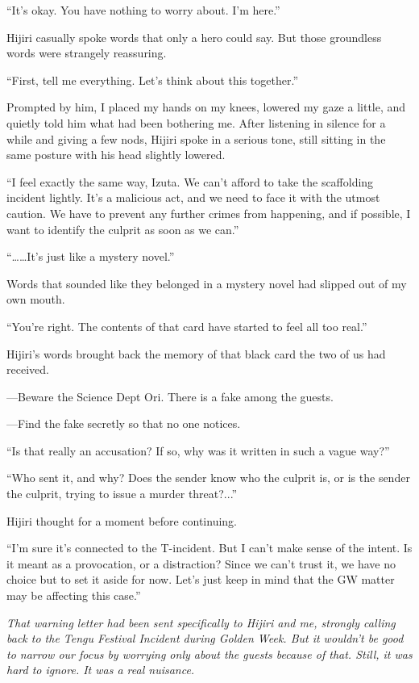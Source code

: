 \documentclass[
    a4paper,
    12pt,
    twoside,
    openany,
    UTF8,
    fontset=windows
]{ctexbook}
\begin{document}
``It's okay. You have nothing to worry about. I'm here.''

Hijiri casually spoke words that only a hero could say. But those groundless words were strangely reassuring.

``First, tell me everything. Let's think about this together.''

Prompted by him, I placed my hands on my knees, lowered my gaze a little, and quietly told him what had been bothering me. After listening in silence for a while and giving a few nods, Hijiri spoke in a serious tone, still sitting in the same posture with his head slightly lowered.

``I feel exactly the same way, Izuta. We can't afford to take the scaffolding incident lightly. It's a malicious act, and we need to face it with the utmost caution. We have to prevent any further crimes from happening, and if possible, I want to identify the culprit as soon as we can.''

``\dots\dots It's just like a mystery novel.''

Words that sounded like they belonged in a mystery novel had slipped out of my own mouth.

``You're right. The contents of that card have started to feel all too real.''

Hijiri's words brought back the memory of that black card the two of us had received.

---Beware the Science Dept Ori. There is a fake among the guests.

---Find the fake secretly so that no one notices.

``Is that really an accusation? If so, why was it written in such a vague way?''

``Who sent it, and why? Does the sender know who the culprit is, or is the sender the culprit, trying to issue a murder threat?...''

Hijiri thought for a moment before continuing.

``I'm sure it's connected to the T-incident. But I can't make sense of the intent. Is it meant as a provocation, or a distraction? Since we can't trust it, we have no choice but to set it aside for now. Let's just keep in mind that the GW matter may be affecting this case.''

\textit{That warning letter had been sent specifically to Hijiri and me, strongly calling back to the Tengu Festival Incident during Golden Week. But it wouldn't be good to narrow our focus by worrying only about the guests because of that. Still, it was hard to ignore. It was a real nuisance.}
\end{document}
